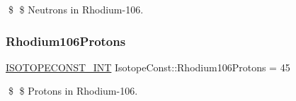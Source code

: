 \$ \$ Neutrons in Rhodium-\/106. \mbox{\label{group___isotope_const-_rhodium-_rh106_gaee63df6b5511b448eb7b1fbcda6dd8ce}} 
\subsubsection{\texorpdfstring{Rhodium106\+Protons}{Rhodium106Protons}}
{\footnotesize\ttfamily \mbox{\hyperlink{group___isotope_const-_macros_ga5f18360b3e99483a35c32d789e62621c}{I\+S\+O\+T\+O\+P\+E\+C\+O\+N\+S\+T\+\_\+\+I\+NT}} Isotope\+Const\+::\+Rhodium106\+Protons = 45}

\$ \$ Protons in Rhodium-\/106. 